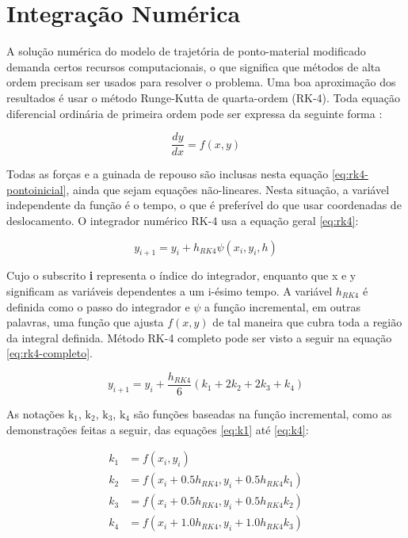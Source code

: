 \section{Integração Numérica}
\label{sec:numint}

A solução numérica do modelo de trajetória de ponto-material modificado demanda certos recursos computacionais, o que significa que métodos de alta ordem precisam ser usados para resolver o problema. Uma boa aproximação dos resultados é usar o método Runge-Kutta de quarta-ordem (RK-4). Toda equação diferencial ordinária de primeira ordem pode ser expressa da seguinte forma \cite{ruggiero1996calculo}:

\begin{equation}
    \label{eq:rk4-pontoinicial}
    \frac{dy}{dx} = f(x,y)
\end{equation}

Todas as forças e a guinada de repouso são inclusas nesta equação \ref{eq:rk4-pontoinicial}, ainda que sejam equações não-lineares. Nesta situação, a variável independente da função é o tempo, o que é preferível do que usar coordenadas de deslocamento. O integrador numérico RK-4 usa a equação geral \ref{eq:rk4}:

\begin{equation}
    \label{eq:rk4}
    y_{i+1} = y_{i} + h_{RK4}\psi(x_{i},y_{i},h)
\end{equation}

Cujo o subscrito \textbf{i} representa o índice do integrador, enquanto que x e y significam as variáveis dependentes a um i-ésimo tempo. A variável \(h_{RK4}\) é definida como o passo do integrador e \(\psi\) a função incremental, em outras palavras, uma função que ajusta \(f(x,y)\) de tal maneira que cubra toda a região da integral definida. Método RK-4 completo pode ser visto a seguir na equação \ref{eq:rk4-completo}.

\begin{equation}
    \label{eq:rk4-completo}
    y_{i+1} = y_{i} + \frac{h_{RK4}}{6}(k_{1}+2k_{2}+2k_{3}+k_{4})
\end{equation}

As notações \(\text{k}_{1}\), \(\text{k}_{2}\), \(\text{k}_{3}\), \(\text{k}_{4}\) são funções baseadas na função incremental, como as demonstrações feitas a seguir, das equações \ref{eq:k1} até \ref{eq:k4}:

\begin{subequations}\label{eq:rk4-termos-k1-ate-k4}
\begin{align}
    \label{eq:k1}
    k_{1} &= f(x_{i},y_{i}) \\
    \label{eq:k2}
    k_{2} &= f(x_{i}+\num{0,5}h_{RK4},y_{i}+\num{0,5}h_{RK4}k_{1}) \\
    \label{eq:k3}
    k_{3} &= f(x_{i}+\num{0,5}h_{RK4},y_{i}+\num{0,5}h_{RK4}k_{2}) \\
    \label{eq:k4}
    k_{4} &= f(x_{i}+\num{1,0}h_{RK4},y_{i}+\num{1,0}h_{RK4}k_{3}) 
\end{align}
\end{subequations}

